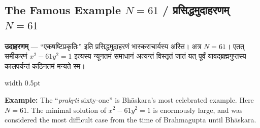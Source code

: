 \documentclass[11pt,a4paper]{article}
\newcommand{\dev}[1]{{\devanagarifont #1}}
\newcommand{\vs}{\vspace{0.5em}}
\newcommand{\bilingual}[2]{%
  \par\vspace{0.5em}%
  \noindent\begin{minipage}[t]{0.47\textwidth}%
  \setlength{\parindent}{0pt}%
  \small #1%
  \end{minipage}%
  \hfill\textcolor{columnrule}{\vrule width 0.5pt}\hfill%
  \begin{minipage}[t]{0.47\textwidth}%
  \setlength{\parindent}{0pt}%
  \small\raggedright #2%
  \end{minipage}%
  \par\vspace{0.5em}%
}
\begin{document}
\newpage

\subsection*{The Famous Example $N=61$ / प्रसिद्धमुदाहरणम् $N=61$}

\bilingual{\textbf{उदाहरणम्} — \dev{``एकषष्टिप्रकृतिः''} इति प्रसिद्धमुदाहरणं भास्कराचार्यस्य अस्ति। अत्र $N = 61$। एतत् समीकरणं $x^2 - 61y^2 = 1$ इत्यस्य न्यूनतमं समाधानं अत्यन्तं विस्तृतं जातं यत् पूर्वं यावद्ब्रह्मगुप्तस्य कालपर्यन्तं कठिनतमं मन्यते स्म।
}{%
\textbf{Example:} The ``\textit{prak\d{r}ti} sixty-one'' is Bh\={a}skara's most celebrated example. Here $N = 61$. The minimal solution of $x^2 - 61y^2 = 1$ is enormously large, and was considered the most difficult case from the time of Brahmagupta until Bh\={a}skara.}

\vs
\end{document}
